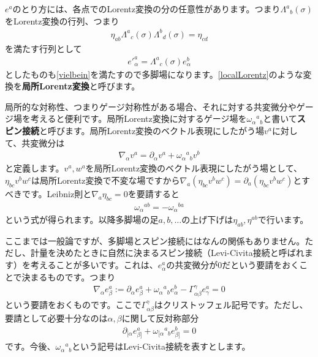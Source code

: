 \documentclass[report,paper=a4, fontsize=12pt, line_length=16cm, number_of_lines=33,dvipdfmx]{jlreq}
\numberwithin{equation}{chapter}
\numberwithin{equation}{section}
\newcommand{\del}{\partial}
\newcommand{\kyou}[1]{{\sffamily \bfseries #1}}
\begin{document}
$e^{a}$のとり方には、各点でのLorentz変換の分の任意性があります。つまり$\Lambda^{a}{}_{b}(\sigma)$をLorentz変換の行列、つまり
\begin{align}
  \eta_{ab}\Lambda^{a}{}_{c}(\sigma)\Lambda^{b}{}_{d}(\sigma)=\eta_{cd}
\end{align}
を満たす行列として
\begin{align}
  e'^{a}_{\alpha}=\Lambda^{a}{}_{c}(\sigma)e^{b}_{\alpha}
  \label{localLorentz}
\end{align}
としたものも\eqref{vielbein}を満たすので多脚場になります。\eqref{localLorentz}のような変換を\kyou{局所Lorentz変換}と呼びます。

局所的な対称性、つまりゲージ対称性がある場合、それに対する共変微分やゲージ場を考えると便利です。局所Lorentz変換に対するゲージ場を$\omega_{\alpha}{}^{a}{}_{b}$と書いて\kyou{スピン接続}と呼びます。局所Lorentz変換のベクトル表現にしたがう場$v^{a}$に対して、共変微分は
\begin{align}
  \nabla_{\alpha}v^{a}=\del_{\alpha}v^{a}+\omega_{\alpha}{}^{a}{}_{b}v^{b}
\end{align}
と定義します。$v^{a},w^{a}$を局所Lorentz変換のベクトル表現にしたがう場として、$\eta_{bc}v^{b}w^{c}$は局所Lorentz変換で不変な場ですから$\nabla_{a}(\eta_{bc}v^{b}w^{c})=\del_{a}(\eta_{bc}v^{b}w^{c})$とすべきです。Leibniz則と$\nabla_{a}\eta_{bc}=0$を要請すると
\begin{align}
  \omega_{\alpha}{}^{ab}
  =-\omega_{\alpha}{}^{ba}
\end{align}
という式が得られます。以降多脚場の足$a,b,\dots$の上げ下げは$\eta_{ab},\eta^{ab}$で行います。

ここまでは一般論ですが、多脚場とスピン接続にはなんの関係もありません。ただし、計量を決めたときに自然に決まるスピン接続（Levi-Civita接続と呼ばれます）を考えることが多いです。これは、$e^{a}_{\alpha}$の共変微分が$0$だという要請をおくことで決まるものです。つまり
\begin{align}
  \nabla_{\alpha}e^{a}_{\beta}:=\del_{\alpha}e^{a}_{\beta}+\omega_{\alpha}{}^{a}{}_{b}e^{b}_{\alpha}-\Gamma^{\gamma}_{\alpha\beta}e^{a}_{\gamma}=0
\end{align}
という要請をおくものです。ここで$\Gamma^{\gamma}_{\alpha\beta}$はクリストッフェル記号です。ただし、要請として必要十分なのは$\alpha,\beta$に関して反対称部分
\begin{align}
  \del_{[\alpha}e^{a}_{\beta]}+\omega_{[\alpha}{}^{a}{}_{b}e^{b}_{\beta]}=0
\end{align}
です。今後、$\omega_{\alpha}{}^{a}{}_{b}$という記号はLevi-Civita接続を表すとします。
\end{document}
